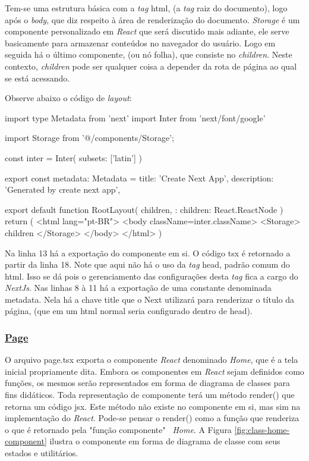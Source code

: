 Tem-se uma estrutura básica com a \textit{tag} html, (a \textit{tag} raiz do documento),
logo após o \textit{body}, que diz respeito à área de renderização do documento.
\textit{Storage} é um componente personalizado em \textit{React} que será discutido mais adiante,
ele serve basicamente para armazenar conteúdos no navegador do usuário.
Logo em seguida há o último componente, (ou nó folha), que consiste no
\textit{children}. Neste contexto, \textit{children} pode ser qualquer coisa a depender
da rota de página ao qual se está acessando.

Observe abaixo o código de \textit{layout}:

\begin{Codecad9f39645824fb9bc4282ec63182ce3}
import type { Metadata } from 'next'
import { Inter } from 'next/font/google'

import Storage from '@/components/Storage';

const inter = Inter({ subsets: ['latin'] })

export const metadata: Metadata = {
    title: 'Create Next App',
    description: 'Generated by create next app',
}

export default function RootLayout({
    children,
}: {
    children: React.ReactNode
}) {
    return (
        <html lang="pt-BR">
            <body className={inter.className}>
                <Storage>
                    {children}
                </Storage>
            </body>
        </html>
    )
}
\end{Codecad9f39645824fb9bc4282ec63182ce3}

Na linha 13 há a exportação do componente em si. O código
\acrshort{tsx}
é retornado a partir da linha 18.
Note que aqui não há o uso da \textit{tag} head, padrão comum do
\acrshort{html}. Isso se dá
pois o gerenciamento das configurações desta \textit{tag} fica
a cargo do \textit{NextJs}. Nas linhas 8 à 11
há a exportação de uma constante denominada metadata. Nela
há a chave title que o Next utilizará para renderizar o
título da página, (que em um html normal seria configurado
dentro de head).

\subsubsection{\underline{Page}}

O arquivo page.tsx exporta o componente \textit{React} denominado \textit{Home},
que é a tela inicial propriamente dita.
Embora os componentes em \textit{React} sejam definidos como funções,
os mesmos serão representados em forma de diagrama de
classes para fins didáticos. Toda representação de
componente terá um método render() que retorna um código
\acrshort{jsx}. Este método
não existe no componente em si, mas sim na implementação
do \textit{React}. Pode-se pensar o render() como a função que
renderiza o que é retornado pela "função componente"~
\textit{Home}.
A
Figura \ref{fig:class-home-component}
ilustra o componente em forma de diagrama de classe com seus estados e utilitários.

